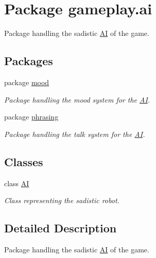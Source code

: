 \hypertarget{a00082}{\section{Package gameplay.\-ai}
\label{a00082}
}


Package handling the sadistic \hyperlink{a00001}{A\-I} of the game.  


\subsection*{Packages}
\begin{DoxyCompactItemize}
\item 
package \hyperlink{a00083}{mood}
\begin{DoxyCompactList}\small\item\em Package handling the mood system for the \hyperlink{a00001}{A\-I}. \end{DoxyCompactList}\item 
package \hyperlink{a00084}{phrasing}
\begin{DoxyCompactList}\small\item\em Package handling the talk system for the \hyperlink{a00001}{A\-I}. \end{DoxyCompactList}\end{DoxyCompactItemize}
\subsection*{Classes}
\begin{DoxyCompactItemize}
\item 
class \hyperlink{a00001}{A\-I}
\begin{DoxyCompactList}\small\item\em Class representing the sadistic robot. \end{DoxyCompactList}\end{DoxyCompactItemize}


\subsection{Detailed Description}
Package handling the sadistic \hyperlink{a00001}{A\-I} of the game. 